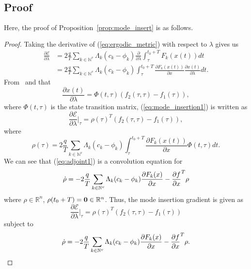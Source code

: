 \documentclass[letterpaper, 10 pt, conference]{ieeeconf}  %
\begin{document}
\subsection{Proof}
\label{sec:proof}
Here, the proof of Proposition~\ref{prop:mode_insert} is as follows.

\begin{proof}
Taking the derivative of (\ref{eq:ergodic_metric}) with respect to $\lambda$ gives us
\begin{align}\label{eq:mode_insertion1}
\frac{\partial \mathcal{E}}{\partial \lambda} & = 2 \frac{q}{T}\sum_{k \in \mathbb{N}^v} \Lambda_k(c_k - \phi_k)\frac{\partial}{\partial \lambda} \int_{\tau}^{t_0+T} F_k(x(t))dt \\
& =2 \frac{q}{T}\sum_{k \in \mathbb{N}^v} \Lambda_k(c_k - \phi_k) \int_{\tau}^{t_0+T} \frac{ \partial F_k(x(t))}{\partial x} \frac{\partial x(t)}{\partial \lambda}dt. \nonumber
\end{align}
From~\cite{egerstedt2006transition,caldwell2016projection} and that
\begin{equation}
\frac{\partial x(t)}{\partial \lambda} = \Phi(t,\tau) \left( f_2(\tau, \tau) - f_1(\tau) \right),
\end{equation}
where $\Phi(t, \tau)$ is the state transition matrix, (\ref{eq:mode_insertion1}) is written as
\begin{equation} \label{eq:mode_intersion2}
\frac{\partial \mathcal{E}}{\partial \lambda}\Big | _\tau = \rho(\tau)^T \left( f_2(\tau, \tau) - f_1(\tau) \right),
\end{equation}
where  
\begin{equation} \label{eq:adjoint1}
\rho(\tau) = 2 \frac{q}{T}\sum_{k \in \mathbb{N}^v} \Lambda_k(c_k - \phi_k) \int_{\tau}^{t_0+T} \frac{ \partial F_k(x(t))}{\partial x} \Phi(t,\tau)dt.
\end{equation} 
We can see that (\ref{eq:adjoint1}) is a convolution equation for
\begin{equation}
\dot{\bold{\rho}} = - 2\frac{q}{T}\sum_{k \in \mathbb{N}^v}\Lambda_k(c_k - \phi_k) \frac{\partial F_k(x)}{\partial x} - \frac{\partial f}{\partial x }^T \rho
\end{equation}
where $\rho \in \mathbb{R}^n$, $\rho(t_0+T) = \bold{0} \in \mathbb{R}^n$.
Thus, the mode insertion gradient is given as
\begin{equation}
 \frac{\partial \mathcal{E}}{\partial \lambda}\Big | _\tau = \rho(\tau) ^T (f_2(\tau,\tau) - f_1(\tau))
\end{equation}
subject to
\begin{equation}
\dot{\bold{\rho}} = - 2\frac{q}{T}\sum_{k \in \mathbb{N}^v}\Lambda_k(c_k - \phi_k) \frac{\partial F_k(x)}{\partial x} - \frac{\partial f}{\partial x }^T \rho.
\end{equation}
\end{proof}
\end{document}
